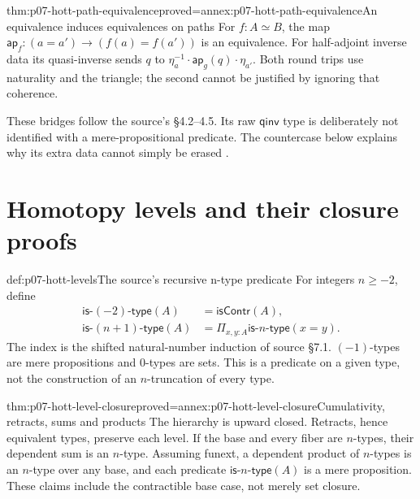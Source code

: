 \begin{hbtheorem}{thm:p07-hott-path-equivalence}{proved=annex:p07-hott-path-equivalence}{An equivalence induces equivalences on paths}
For $f:A\simeq B$, the map
$\mathsf{ap}_f:(a=a')\to(f(a)=f(a'))$ is an equivalence.
For half-adjoint inverse data its quasi-inverse sends $q$ to
$\eta_a^{-1}\cdot\mathsf{ap}_g(q)\cdot\eta_{a'}$.
Both round trips use naturality and the triangle; the second cannot be
justified by ignoring that coherence.
\end{hbtheorem}

These bridges follow the source's \S4.2--4.5. Its raw $\mathsf{qinv}$
type is deliberately not identified with a mere-propositional predicate.
The countercase below explains why its extra data cannot simply be erased
\parencite[\S2.4, \S2.11, \S4.1--4.5]{HoTT2013PublicReleaseFoundations}.

\section{Homotopy levels and their closure proofs}
\label{sec:p07-hott-levels}

\begin{hbdefinition}{def:p07-hott-levels}{The source's recursive n-type predicate}
For integers $n\geq-2$, define
\[
 \begin{aligned}
 \mathsf{is}\mbox{-}(-2)\mbox{-}\mathsf{type}(A)&=\mathsf{isContr}(A),\\
 \mathsf{is}\mbox{-}(n+1)\mbox{-}\mathsf{type}(A)
   &=\Pi_{x,y:A}\mathsf{is}\mbox{-}n\mbox{-}\mathsf{type}(x=y).
 \end{aligned}
\]
The index is the shifted natural-number induction of source \S7.1.
$(-1)$-types are mere propositions and $0$-types are sets.
This is a predicate on a given type, not the construction of an
$n$-truncation of every type.
\end{hbdefinition}

\begin{hbtheorem}{thm:p07-hott-level-closure}{proved=annex:p07-hott-level-closure}{Cumulativity, retracts, sums and products}
The hierarchy is upward closed. Retracts, hence equivalent types, preserve
each level. If the base and every fiber are $n$-types, their dependent sum
is an $n$-type. Assuming funext, a dependent product of $n$-types is an
$n$-type over any base, and each predicate
$\mathsf{is}\mbox{-}n\mbox{-}\mathsf{type}(A)$ is a mere proposition.
These claims include the contractible base case, not merely set closure.
\end{hbtheorem}

